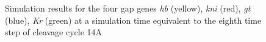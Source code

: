 \documentclass[12pt,a4paper,twoside,openright]{book}
\begin{document}
\begin{figure}
\caption{Simulation results for the four gap genes \emph{hb} (yellow), \emph{kni} (red), \emph{gt} (blue), \emph{Kr} (green) at a simulation time equivalent to the 
eighth time step of cleavage cycle 14A}
\label{fig:simres}
\end{figure}
\end{document}
